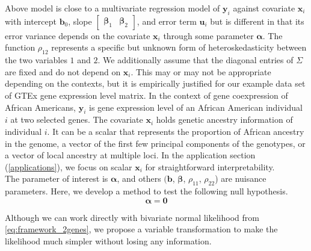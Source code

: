 \documentclass[aoas,preprint]{imsart}
\numberwithin{equation}{section}
\theoremstyle{plain}
\begin{document}
Above model is close to a multivariate regression model of $\bm{y}_i$ against covariate $\bm{x}_i$ with intercept $\bm{b}_0$, slope $\begin{bmatrix} \bm{\beta}_1 & \bm{\beta}_2 \end{bmatrix}$, and error term $\bm{u}_i$ but is different in that its error variance depends on the covariate $\bm{x}_i$ through some parameter $\bm{\alpha}$. The function $\rho_{12}$ represents a specific but unknown form of heteroskedasticity between the two variables $1$ and $2$. We additionally assume that the diagonal entries of $\Sigma$ are fixed and do not depend on $\bm{x}_i$. This may or may not be appropriate depending on the contexts, but it is empirically justified for our example data set of GTEx gene expression level matrix. In the context of gene coexpression of African Americans, $\bm{y}_i$ is gene expression level of an African American individual $i$ at two selected genes. The covariate $\bm{x}_i$ holds genetic ancestry information of individual $i$. It can be a scalar that represents the proportion of African ancestry in the genome, a vector of the first few principal components of the genotypes, or a vector of local ancestry at multiple loci. In the application section (\ref{applications}), we focus on scalar $\bm{x}_i$ for straightforward interpretability. \\

The parameter of interest is $\bm{\alpha}$, and others $(\bm{b}$, $\bm{\beta}$, $\rho_{11}$, $\rho_{22}$) are nuisance parameters. Here, we develop a method to test the following null hypothesis.
\begin{equation}
    \bm{\alpha} = \bm{0}
    \label{eq:null}
\end{equation}

Although we can work directly with bivariate normal likelihood from \ref{eq:framework_2genes}, we propose a variable transformation to make the likelihood much simpler without losing any information. 
\end{document}
